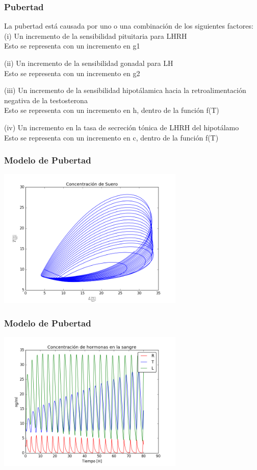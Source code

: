 \documentclass[10pt]{beamer}
\begin{document}
\begin{frame}
\frametitle{Pubertad}

La pubertad está causada por uno o una combinación de los siguientes factores:\\

(i) Un incremento de la sensibilidad pituitaria para LHRH \\

Esto se representa con un incremento en g1

(ii) Un incremento de la sensibilidad gonadal para LH\\

Esto se representa con un incremento en g2

(iii) Un incremento de la sensibilidad hipotálamica hacia la retroalimentación negativa de la testosterona\\

Esto se representa con un incremento en h, dentro de la función f(T)

(iv) Un incremento en la tasa de secreción tónica de LHRH del hipotálamo\\

Esto se representa con un incremento en c, dentro de la función f(T)
\end{frame}

\begin{frame}
\frametitle{Modelo de Pubertad}
\begin{center}
 \includegraphics[width=3.5in]{imagenes/Graficas/Pubertad/pubertad_concentracion_de_suero.png}
\end{center}
\end{frame}

\begin{frame}
\frametitle{Modelo de Pubertad}
\begin{center}
 \includegraphics[width=3.5in]{imagenes/Graficas/Pubertad/pubertad.png}
\end{center}
\end{frame}
\end{document}
